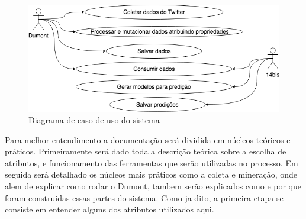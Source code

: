 \begin{figure}
    \centering
    \includegraphics[width=.8\textwidth]{imagens/tcc_caso_de_uso.png}
    \caption{Diagrama de caso de uso do sistema}
    \label{fig:tcc_caso_de_uso}
\end{figure}

Para melhor entendimento a documentação será dividida em núcleos teóricos e práticos. Primeiramente será dado toda a descrição teórica sobre a escolha de atributos, e funcionamento das ferramentas que serão utilizadas no processo. Em seguida será detalhado os núcleos mais práticos como a coleta e mineração, onde alem de explicar como rodar o Dumont, tambem serão explicados como e por que foram construidas essas partes do sistema. Como ja dito, a primeira etapa se consiste em entender alguns dos atributos utilizados aqui.



